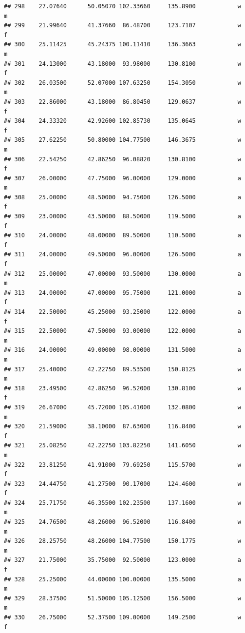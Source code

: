\documentclass[]{article}
\begin{document}
\begin{verbatim}
## 298    27.07640      50.05070 102.33660     135.8900            w         m
## 299    21.99640      41.37660  86.48700     123.7107            w         f
## 300    25.11425      45.24375 100.11410     136.3663            w         m
## 301    24.13000      43.18000  93.98000     130.8100            w         f
## 302    26.03500      52.07000 107.63250     154.3050            w         m
## 303    22.86000      43.18000  86.80450     129.0637            w         f
## 304    24.33320      42.92600 102.85730     135.0645            w         f
## 305    27.62250      50.80000 104.77500     146.3675            w         m
## 306    22.54250      42.86250  96.08820     130.8100            w         f
## 307    26.00000      47.75000  96.00000     129.0000            a         m
## 308    25.00000      48.50000  94.75000     126.5000            a         f
## 309    23.00000      43.50000  88.50000     119.5000            a         f
## 310    24.00000      48.00000  89.50000     110.5000            a         f
## 311    24.00000      49.50000  96.00000     126.5000            a         f
## 312    25.00000      47.00000  93.50000     130.0000            a         m
## 313    24.00000      47.00000  95.75000     121.0000            a         f
## 314    22.50000      45.25000  93.25000     122.0000            a         f
## 315    22.50000      47.50000  93.00000     122.0000            a         m
## 316    24.00000      49.00000  98.00000     131.5000            a         m
## 317    25.40000      42.22750  89.53500     150.8125            w         m
## 318    23.49500      42.86250  96.52000     130.8100            w         f
## 319    26.67000      45.72000 105.41000     132.0800            w         m
## 320    21.59000      38.10000  87.63000     116.8400            w         f
## 321    25.08250      42.22750 103.82250     141.6050            w         m
## 322    23.81250      41.91000  79.69250     115.5700            w         f
## 323    24.44750      41.27500  90.17000     124.4600            w         f
## 324    25.71750      46.35500 102.23500     137.1600            w         m
## 325    24.76500      48.26000  96.52000     116.8400            w         m
## 326    28.25750      48.26000 104.77500     150.1775            w         m
## 327    21.75000      35.75000  92.50000     123.0000            a         f
## 328    25.25000      44.00000 100.00000     135.5000            a         m
## 329    28.37500      51.50000 105.12500     156.5000            w         m
## 330    26.75000      52.37500 109.00000     149.2500            w         f

\end{verbatim}
\end{document}

